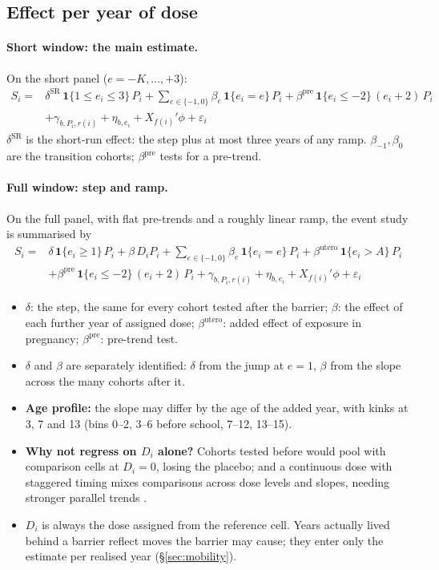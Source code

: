 \documentclass[11pt]{article}
\begin{document}
\subsection{Effect per year of dose}\label{sec:dose}

\paragraph{Short window: the main estimate.} On the short panel (\(e = -K, \dots, +3\)):
\begin{align*}
S_i ={}& \delta^{\text{SR}}\, \mathbf{1}\{1 \le e_i \le 3\}\, P_i + \sum_{e \in \{-1, 0\}} \beta_e\, \mathbf{1}\{e_i = e\}\, P_i + \beta^{\text{pre}}\, \mathbf{1}\{e_i \le -2\}\,(e_i + 2)\, P_i \\
&+ \gamma_{b,P_i,r(i)} + \eta_{b,e_i} + X_{f(i)}'\phi + \varepsilon_i
\end{align*}
\(\delta^{\text{SR}}\) is the short-run effect: the step plus at most three years of any ramp.
\(\beta_{-1}, \beta_0\) are the transition cohorts; \(\beta^{\text{pre}}\) tests for a pre-trend.

\paragraph{Full window: step and ramp.} On the full panel, with flat pre-trends and a roughly
linear ramp, the event study is summarised by
\begin{align*}
S_i ={}& \delta\, \mathbf{1}\{e_i \ge 1\}\, P_i + \beta\, D_i P_i + \sum_{e \in \{-1, 0\}} \beta_e\, \mathbf{1}\{e_i = e\}\, P_i + \beta^{\text{utero}}\, \mathbf{1}\{e_i > A\}\, P_i \\
&+ \beta^{\text{pre}}\, \mathbf{1}\{e_i \le -2\}\,(e_i + 2)\, P_i + \gamma_{b,P_i,r(i)} + \eta_{b,e_i} + X_{f(i)}'\phi + \varepsilon_i
\end{align*}
\begin{itemize}
\item \(\delta\): the step, the same for every cohort tested after the barrier;
  \(\beta\): the effect of each further year of assigned dose; \(\beta^{\text{utero}}\): added
  effect of exposure in pregnancy; \(\beta^{\text{pre}}\): pre-trend test.
\item \(\delta\) and \(\beta\) are separately identified: \(\delta\) from the jump at \(e = 1\),
  \(\beta\) from the slope across the many cohorts after it.
\item \textbf{Age profile:} the slope may differ by the age of the added year, with kinks at 3,
  7 and 13 (bins 0--2, 3--6 before school, 7--12, 13--15).
\item \textbf{Why not regress on \(D_i\) alone?} Cohorts tested before would pool with
  comparison cells at \(D_i = 0\), losing the placebo; and a continuous dose with staggered
  timing mixes comparisons across dose levels and slopes, needing stronger parallel trends
  \autocite{callawayDifferenceinDifferencesContinuousTreatment2024}.
\item \(D_i\) is always the dose assigned from the reference cell. Years actually lived behind a
  barrier reflect moves the barrier may cause; they enter only the estimate per realised year
  (\S\ref{sec:mobility}).
\end{itemize}
\end{document}

